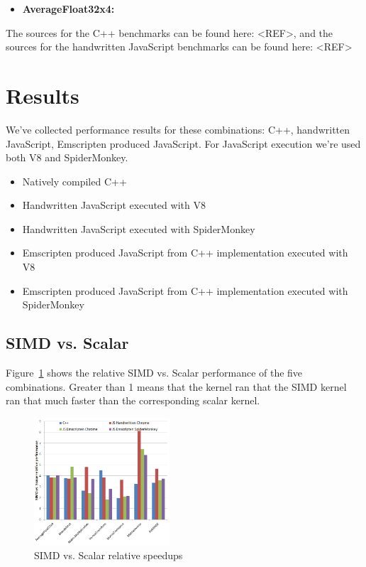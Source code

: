\documentclass[preprint]{sigplanconf}
\begin{document}
\begin{itemize}
\item
\textbf{AverageFloat32x4:}

\end{itemize}

The sources for the C++ benchmarks can be found here: <REF>, and the sources
for the handwritten JavaScript benchmarks can be found here: <REF>

\section{Results}

We've collected performance results for these combinations: C++, handwritten
JavaScript, Emscripten produced JavaScript.  For JavaScript execution we're
used both V8 and SpiderMonkey.

\begin{itemize}
\item
Natively compiled C++

\item
Handwritten JavaScript executed with V8

\item
Handwritten JavaScript executed with SpiderMonkey

\item
Emscripten produced JavaScript from C++ implementation executed with V8

\item
Emscripten produced JavaScript from C++ implementation executed with
SpiderMonkey
\end{itemize}

\subsection{SIMD vs. Scalar}

Figure~\ref{fig:simd-scalar-speedup} shows the relative SIMD vs. Scalar performance
of the five combinations.  Greater than 1 means that the kernel ran that the SIMD
kernel ran that much faster than the corresponding scalar kernel.

\begin{figure}
\begin{center}
\includegraphics[width=0.45\textwidth]{figures/simd-scalar-speedup.png}
\end{center}
\caption{SIMD vs. Scalar relative speedups}
\label{fig:simd-scalar-speedup}
\end{figure}
\end{document}
